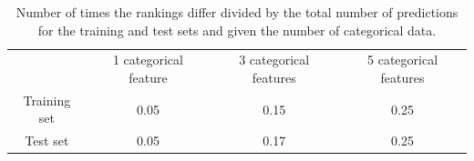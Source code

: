 \documentclass[11pt]{article}
\begin{document}
\begin{table}[H]
    \centering
    \begin{tabular}{cccc}
      \midrule
      & 1 categorical feature & 3 categorical features & 5 categorical features \\
      Training set & 0.05 & 0.15 & 0.25 \\
      Test set & 0.05 & 0.17 & 0.25 \\
      \bottomrule
    \end{tabular}
    \caption{Number of times the rankings differ divided by the total number of
     predictions for the training and test sets and given the number of categorical data.}
    \label{table:rankings}
  \end{table}


\newpage

\end{document}
